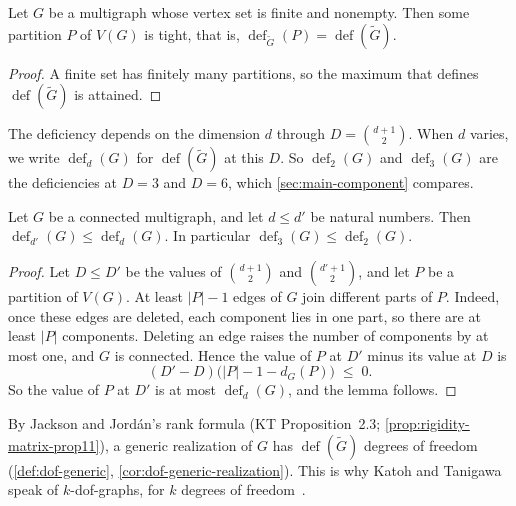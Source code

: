 \begin{lemma}
  \label{lem:exists-tight-partition}
  \leanok
  Let $G$ be a multigraph whose vertex set is finite and nonempty. Then
  some partition $P$ of $V(G)$ is tight, that is,
  $\operatorname{def}_{\tilde G}(P) = \operatorname{def}(\tilde G)$.
\end{lemma}
\begin{proof}
  \leanok
  A finite set has finitely many partitions, so the maximum that
  defines $\operatorname{def}(\tilde G)$ is attained.
\end{proof}

The deficiency depends on the dimension $d$ through
$D = \binom{d+1}{2}$. When $d$ varies, we write
$\operatorname{def}_d(G)$ for $\operatorname{def}(\tilde G)$ at this
$D$. So $\operatorname{def}_2(G)$ and $\operatorname{def}_3(G)$ are the
deficiencies at $D = 3$ and $D = 6$, which \cref{sec:main-component}
compares.

\begin{lemma}
  \label{lem:deficiency-antitone}
  \leanok
  Let $G$ be a connected multigraph, and let $d \le d'$ be natural
  numbers. Then $\operatorname{def}_{d'}(G) \le \operatorname{def}_d(G)$.
  In particular $\operatorname{def}_3(G) \le \operatorname{def}_2(G)$.
\end{lemma}
\begin{proof}
  \leanok
  Let $D \le D'$ be the values of $\binom{d+1}{2}$ and
  $\binom{d'+1}{2}$, and let $P$ be a partition of $V(G)$. At least
  $|P| - 1$ edges of $G$ join different parts of $P$. Indeed, once these
  edges are deleted, each component lies in one part, so there are at
  least $|P|$ components. Deleting an edge raises the number of
  components by at most one, and $G$ is connected. Hence the value of
  $P$ at $D'$ minus its value at $D$ is
  \[
    (D' - D)\bigl(|P| - 1 - d_G(P)\bigr) \;\le\; 0.
  \]
  So the value of $P$ at $D'$ is at most $\operatorname{def}_d(G)$, and
  the lemma follows.
\end{proof}

By Jackson and Jord\'an's rank formula (KT Proposition~2.3;
\cref{prop:rigidity-matrix-prop11}), a generic realization of $G$ has
$\operatorname{def}(\tilde G)$ degrees of freedom
(\cref{def:dof-generic}, \cref{cor:dof-generic-realization}). This is why Katoh and Tanigawa speak of
$k$-dof-graphs, for $k$ degrees of freedom~\cite[\S3]{katohTanigawa2011}.

